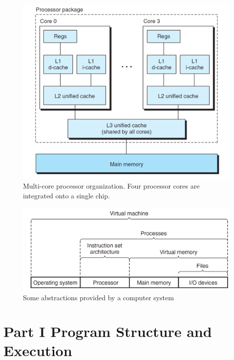 \begin{figure}[h!]
    \centering
    \includegraphics[scale=0.5]{pic/section12/pic9.png}
    \caption{Multi-core processor organization. Four processor cores are integrated onto a single chip.}
\end{figure}


\begin{figure}[h!]
    \centering
    \includegraphics[scale=0.3]{pic/section12/pic10.png}
    \caption{Some abstractions provided by a computer system}
\end{figure}


\part{Part I Program Structure and Execution}

